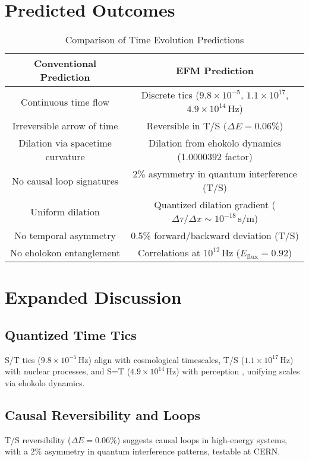 \documentclass[11pt]{article}
\begin{document}
\section{Predicted Outcomes}
\begin{table}[htbp]
    \centering
    \begin{tabular}{|c|c|}
        \hline
        \textbf{Conventional Prediction} & \textbf{EFM Prediction} \\
        \hline
        Continuous time flow & Discrete tics (\(9.8 \times 10^{-5}\), \(1.1 \times 10^{17}\), \(4.9 \times 10^{14} \, \text{Hz}\)) \\
        Irreversible arrow of time & Reversible in T/S (\(\Delta E = 0.06\%\)) \\
        Dilation via spacetime curvature & Dilation from ehokolo dynamics (1.0000392 factor) \\
        No causal loop signatures & 2\% asymmetry in quantum interference (T/S) \\
        Uniform dilation & Quantized dilation gradient (\(\Delta \tau/\Delta x \sim 10^{-18} \, \text{s/m}\)) \\
        No temporal asymmetry & 0.5\% forward/backward deviation (T/S) \\
        No eholokon entanglement & Correlations at \(10^{12} \, \text{Hz}\) (\(E_{\text{flux}} = 0.92\)) \\
        \hline
    \end{tabular}
    \caption{Comparison of Time Evolution Predictions}
    \label{tab:predictions}
\end{table}

\section{Expanded Discussion}
\subsection{Quantized Time Tics}
S/T tics (\(9.8 \times 10^{-5} \, \text{Hz}\)) align with cosmological timescales, T/S (\(1.1 \times 10^{17} \, \text{Hz}\)) with nuclear processes, and S=T (\(4.9 \times 10^{14} \, \text{Hz}\)) with perception \citep{emvula2025configurations}, unifying scales via ehokolo dynamics.

\subsection{Causal Reversibility and Loops}
T/S reversibility (\(\Delta E = 0.06\%\)) suggests causal loops in high-energy systems, with a 2\% asymmetry in quantum interference patterns, testable at CERN.
\end{document}

